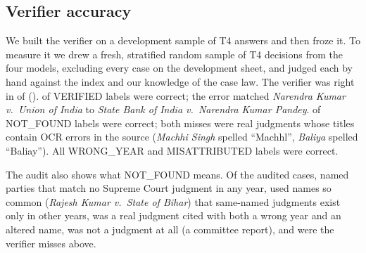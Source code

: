 \begin{table}[t]
\caption{T4: every case cited for \NumTopics{} legal questions, by verifier label. Ver.\ = VERIFIED (with Wilson 95\% interval), W.Yr.\ = WRONG\_YEAR, W.Cit.\ = WRONG\_CITATION, Misatt.\ = MISATTRIBUTED, N.F.\ = NOT\_FOUND.}
\label{tab:t4}
\centering
\footnotesize
\setlength{\tabcolsep}{3.5pt}

\end{table}

\subsection{Verifier accuracy}
\label{sec:audit}
We built the verifier on a development sample of T4 answers and then froze it. To measure it we drew a fresh, stratified random sample of \AuditN{} T4 decisions from the four models, excluding every case on the development sheet, and judged each by hand against the index and our knowledge of the case law. The verifier was right in \AuditCorrect{} of \AuditN{} (\AuditPct). \AuditVerCorrect{} of \AuditVerN{} VERIFIED labels were correct; the error matched \emph{Narendra Kumar v.\ Union of India} to \emph{State Bank of India v.\ Narendra Kumar Pandey}. \AuditNFCorrect{} of \AuditNFN{} NOT\_FOUND labels were correct; both misses were real judgments whose titles contain OCR errors in the source (\emph{Machhi Singh} spelled ``Machhl'', \emph{Baliya} spelled ``Baliay''). All \AuditWYN{} WRONG\_YEAR and \AuditMisN{} MISATTRIBUTED labels were correct.

The audit also shows what NOT\_FOUND means. Of the \AuditNFN{} audited cases, \AuditNFFab{} named parties that match no Supreme Court judgment in any year, \AuditNFGeneric{} used names so common (\emph{Rajesh Kumar v.\ State of Bihar}) that same-named judgments exist only in other years, \AuditNFMisdated{} was a real judgment cited with both a wrong year and an altered name, \AuditNFNotJudgment{} was not a judgment at all (a committee report), and \AuditNFMiss{} were the verifier misses above.







